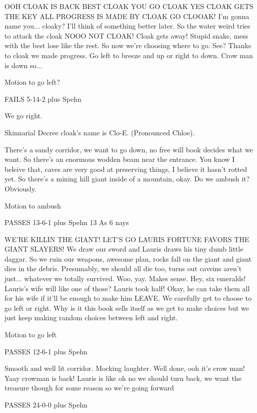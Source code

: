 \documentclass[10pt]{article}
\newcommand{\ps}{ plus Spehn\xspace}
\begin{document}
OOH CLOAK IS BACK BEST CLOAK YOU GO CLOAK YES CLOAK GETS THE KEY ALL PROGRESS IS MADE BY CLOAK GO CLOOAK! I'm gonna name you... cloaky? I'll think of something better later. So the water weird tries to attack the cloak NOOO NOT CLOAK! Cloak gets away! Stupid snake, mess with the best lose like the rest. So now we're choosing where to go. See? Thanks to cloak we made progress. Go left to breeze and up or right to down. Crow man is down so...

Motion to go left?

FAILS 5-14-2\ps

We go right.

Skinnarial Decree cloak's name is Clo-E. (Pronounced Chloe).

There's a sandy corridor, we want to go down, no free will book decides what we want. So there's an enormous wodden beam near the entrance. You know I beleive that, caves are very good at preserving things, I believe it hasn't rotted yet. So there's a mining hill giant inside of a mountain, okay. Do we ambush it? Obviously.

Motion to ambush 

PASSES 13-6-1\ps
13 As
6 nays

WE'RE KILLIN THE GIANT! LET'S GO LAURIS FORTUNE FAVORS THE GIANT SLAYERS! We draw our sword and Lauris draws his tiny dumb little daggar. So we ruin our weapons, awesome plan, rocks fall on the giant and giant dies in the debris. Presumably, we should all die too, turns out caveins aren't just... whatever we totally survived. Woo, yay. Makes sense. Hey, six emeralds! Lauris's wife will like one of those? Lauris took half! Okay, he can take them all for his wife if it'll be enough to make him LEAVE.
We carefully get to choose to go left or right. Why is it this book sells itself as we get to make choices but we just keep making random choices between left and right. 

Motion to go left

PASSES 12-6-1\ps

Smooth and well lit corridor. Mocking laughter. Well done, ooh it's crow man! Yaay crowman is back! Lauris is like oh no we should turn back, we want the treasure though for some reason so we're going forward

PASSES 24-0-0\ps
\end{document}
